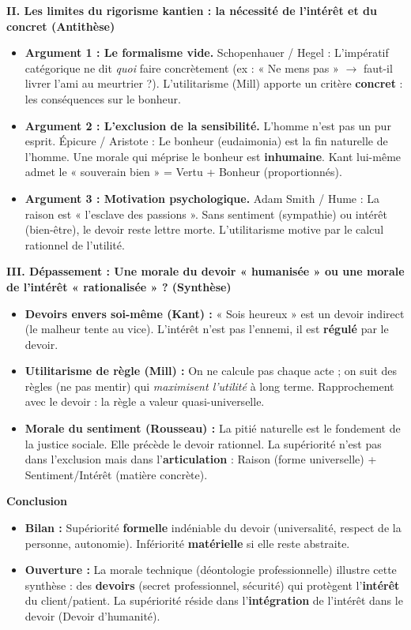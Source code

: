 \documentclass[11pt]{article}
\newcommand{\cle}[1]{{\popxbold\color{popdark}#1}}
\begin{document}
\begin{exoresolu}
\textbf{II. Les limites du rigorisme kantien : la nécessité de l'intérêt et du concret (Antithèse)}
\begin{itemize}
    \item \textbf{Argument 1 : Le formalisme vide.} Schopenhauer / Hegel : L'impératif catégorique ne dit \emph{quoi} faire concrètement (ex : « Ne mens pas » $\rightarrow$ faut-il livrer l'ami au meurtrier ?). L'utilitarisme (Mill) apporte un critère \textbf{concret} : les conséquences sur le bonheur.
    \item \textbf{Argument 2 : L'exclusion de la sensibilité.} L'homme n'est pas un pur esprit. Épicure / Aristote : Le \cle{bonheur} (eudaimonia) est la fin naturelle de l'homme. Une morale qui méprise le bonheur est \textbf{inhumaine}. Kant lui-même admet le « souverain bien » = Vertu + Bonheur (proportionnés).
    \item \textbf{Argument 3 : Motivation psychologique.} Adam Smith / Hume : La raison est « l'esclave des passions ». Sans \cle{sentiment} (sympathie) ou \cle{intérêt} (bien-être), le devoir reste lettre morte. L'utilitarisme motive par le calcul rationnel de l'utilité.
\end{itemize}

\textbf{III. Dépassement : Une morale du devoir « humanisée » ou une morale de l'intérêt « rationalisée » ? (Synthèse)}
\begin{itemize}
    \item \textbf{Devoirs envers soi-même (Kant) :} « Sois heureux » est un \cle{devoir indirect} (le malheur tente au vice). L'intérêt n'est pas l'ennemi, il est \textbf{régulé} par le devoir.
    \item \textbf{Utilitarisme de règle (Mill) :} On ne calcule pas chaque acte ; on suit des règles (ne pas mentir) qui \emph{maximisent l'utilité} à long terme. Rapprochement avec le devoir : la règle a valeur quasi-universelle.
    \item \textbf{Morale du sentiment (Rousseau) :} La \cle{pitié} naturelle est le fondement de la justice sociale. Elle précède le devoir rationnel. La supériorité n'est pas dans l'exclusion mais dans l'\textbf{articulation} : Raison (forme universelle) + Sentiment/Intérêt (matière concrète).
\end{itemize}

\textbf{Conclusion}
\begin{itemize}
    \item \textbf{Bilan :} Supériorité \textbf{formelle} indéniable du devoir (universalité, respect de la personne, autonomie). Infériorité \textbf{matérielle} si elle reste abstraite.
    \item \textbf{Ouverture :} La morale technique (déontologie professionnelle) illustre cette synthèse : des \textbf{devoirs} (secret professionnel, sécurité) qui protègent l'\textbf{intérêt} du client/patient. La supériorité réside dans l'\textbf{intégration} de l'intérêt dans le devoir (Devoir d'humanité).
\end{itemize}
\end{exoresolu}
\end{document}
